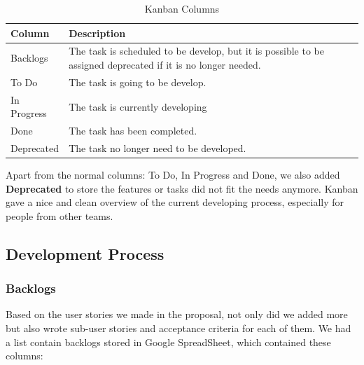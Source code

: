 \documentclass[12pt,a4paper]{article}
\begin{document}
          \begin{table}[H]
            \centering
              \begin{tabularx}{\textwidth}{l X}
                \hline
                Column & Description  \\ \hline
                Backlogs & The task is scheduled to be develop, but it is possible to be assigned deprecated if it is no longer needed. \\ 
                To Do & The task is going to be develop.  \\ 
                In Progress & The task is currently developing  \\ 
                Done & The task has been completed.   \\ 
                Deprecated & The task no longer need to be developed.\\                  
                \hline
              \end{tabularx}
              \caption[Table caption text]{Kanban Columns}
              \label{table:Kanban Columns}
          \end{table}
          
          Apart from the normal columns: To Do, In Progress and Done, we also added {\bf Deprecated} to store the features or tasks did not fit the needs anymore. Kanban gave a nice and clean overview of the current developing process, especially for people from other teams.
        
      \subsection{Development Process}
        \subsubsection{Backlogs}
          Based on the user stories we made in the proposal, not only did we added more but also wrote sub-user stories and acceptance criteria for each of them. We had a list contain backlogs stored in Google SpreadSheet, which contained these columns: 
\end{document}
